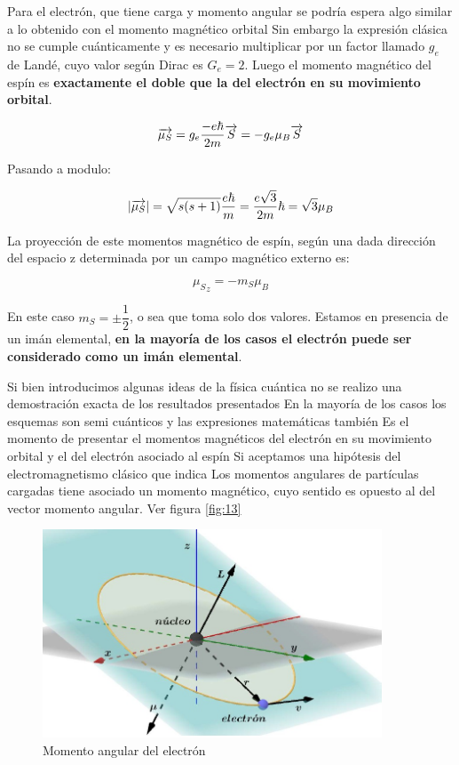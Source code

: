 Para el electrón, que tiene carga y momento angular se podría espera algo similar a lo obtenido con el momento magnético orbital Sin embargo la expresión clásica no se cumple cuánticamente y es necesario multiplicar por un factor llamado $g_{e}$  de Landé, cuyo valor según Dirac es $G_{e}=2$. Luego el momento magnético del espín es \textbf{exactamente el doble que la del electrón en su movimiento orbital}.

\begin{equation}
	\overrightarrow{\mu_{S}} = g_{e} \dfrac{-e\hbar}{2m}\overrightarrow{S} = -g_{e}\mu_{B}\overrightarrow{S}
\end{equation}

Pasando a modulo:

\begin{equation}
	\vert\overrightarrow{\mu_{S}}\vert = \sqrt{s(s+1)} \dfrac{e\hbar}{m} = \dfrac{e\sqrt{3}}{2m} \hbar = \sqrt{3} \mu_{B}
\end{equation}

La proyección de este momentos magnético de espín, según una dada dirección del espacio z determinada por un campo magnético externo es:

\begin{equation}
	{\mu_{S}}_{z} = -m_{S} \mu_{B}
\end{equation}

En este caso $m_{S}=\pm \dfrac{1}{2}$, o sea que toma solo dos valores. Estamos en presencia de un imán elemental, \textbf{en la mayoría de los casos el electrón puede ser considerado como un imán elemental}.

Si bien introducimos algunas ideas de la física cuántica no se realizo una demostración exacta de los resultados presentados En la mayoría de los casos los esquemas son semi cuánticos y las expresiones matemáticas también Es el momento de presentar el momentos magnéticos del electrón en su movimiento orbital y el del electrón asociado al espín Si aceptamos una hipótesis del electromagnetismo clásico que indica Los momentos angulares de partículas cargadas tiene asociado un momento magnético, cuyo sentido es opuesto al del vector momento angular. Ver figura \ref{fig:13}

\begin{figure}[H]
    \centering
    \includegraphics[width=0.9\textwidth]{./Figures/fig113}
	\caption{Momento angular del electrón}
	\label{fig:113}
 \end{figure}

